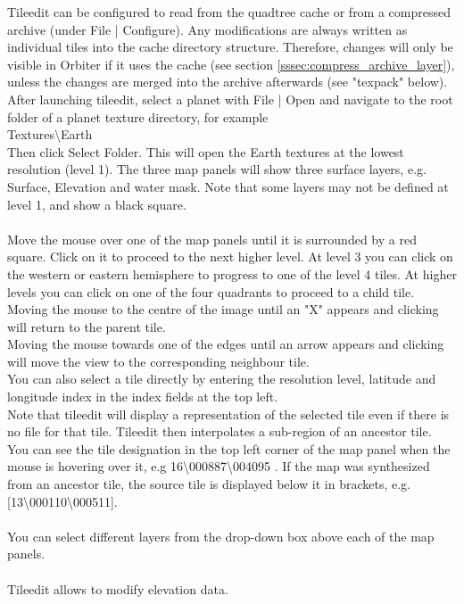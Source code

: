 \documentclass[Orbiter Developer Manual.tex]{subfiles}
\begin{document}
\noindent
Tileedit can be configured to read from the quadtree cache or from a compressed archive (under File | Configure). Any modifications are always written as individual tiles into the cache directory structure. Therefore, changes will only be visible in Orbiter if it uses the cache (see section \ref{sssec:compress_archive_layer}), unless the changes are merged into the archive afterwards (see "texpack" below).\\
After launching tileedit, select a planet with File | Open and navigate to the root folder of a planet texture directory, for example\\
\indent Textures\textbackslash Earth\\
Then click Select Folder. This will open the Earth textures at the lowest resolution (level 1). The three map panels will show three surface layers, e.g. Surface, Elevation and water mask. Note that some layers may not be defined at level 1, and show a black square.\\
\\
Move the mouse over one of the map panels until it is surrounded by a red square. Click on it to proceed to the next higher level. At level 3 you can click on the western or eastern hemisphere to progress to one of the level 4 tiles. At higher levels you can click on one of the four quadrants to proceed to a child tile.\\
Moving the mouse to the centre of the image until an "X" appears and clicking will return to the parent tile.\\
Moving the mouse towards one of the edges until an arrow appears and clicking will move the view to the corresponding neighbour tile.\\
You can also select a tile directly by entering the resolution level, latitude and longitude index in the index fields at the top left.\\
Note that tileedit will display a representation of the selected tile even if there is no file for that tile. Tileedit then interpolates a sub-region of an ancestor tile. You can see the tile designation in the top left corner of the map panel when the mouse is hovering over it, e.g 16\textbackslash 000887\textbackslash 004095 . If the map was synthesized from an ancestor tile, the source tile is displayed below it in brackets, e.g. [13\textbackslash 000110\textbackslash 000511].\\
\\
You can select different layers from the drop-down box above each of the map panels.\\
\\
Tileedit allows to modify elevation data.
\end{document}
